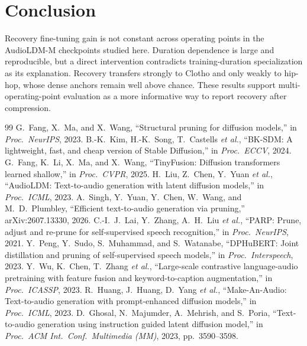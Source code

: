 \section{Conclusion}
Recovery fine-tuning gain is not constant across operating points in the AudioLDM-M checkpoints studied here. Duration dependence is large and reproducible, but a direct intervention contradicts training-duration specialization as its explanation. Recovery transfers strongly to Clotho and only weakly to hip-hop, whose dense anchors remain well above chance. These results support multi-operating-point evaluation as a more informative way to report recovery after compression.

\clearpage
{\setlength{\itemsep}{0pt}\setlength{\parsep}{0pt}
\begin{thebibliography}{99}
 G.~Fang, X.~Ma, and X.~Wang, ``Structural pruning for diffusion
models,'' in \emph{Proc.\ NeurIPS}, 2023.
 B.-K.~Kim, H.-K.~Song, T.~Castells \emph{et al.}, ``BK-SDM: A lightweight, fast,
and cheap version of Stable Diffusion,'' in \emph{Proc.\ ECCV}, 2024.
 G.~Fang, K.~Li, X.~Ma, and X.~Wang, ``TinyFusion: Diffusion transformers
learned shallow,'' in \emph{Proc.\ CVPR}, 2025.
 H.~Liu, Z.~Chen, Y.~Yuan \emph{et al.}, ``AudioLDM: Text-to-audio generation with latent diffusion models,'' in
\emph{Proc.\ ICML}, 2023.
 A.~Singh, Y.~Yuan, Y.~Chen, W.~Wang, and M.~D.~Plumbley, ``Efficient
text-to-audio generation via pruning,'' arXiv:2607.13330, 2026.
 C.-I.~J.~Lai, Y.~Zhang, A.~H.~Liu \emph{et al.}, ``PARP: Prune, adjust and
re-prune for self-supervised speech recognition,'' in \emph{Proc.\ NeurIPS}, 2021.
 Y.~Peng, Y.~Sudo, S.~Muhammad, and S.~Watanabe, ``DPHuBERT: Joint
distillation and pruning of self-supervised speech models,'' in \emph{Proc.\ Interspeech}, 2023.
 Y.~Wu, K.~Chen, T.~Zhang \emph{et al.},
``Large-scale contrastive language-audio pretraining with feature fusion and keyword-to-caption
augmentation,'' in \emph{Proc.\ ICASSP}, 2023.
 R.~Huang, J.~Huang, D.~Yang \emph{et al.}, ``Make-An-Audio:
Text-to-audio generation with prompt-enhanced diffusion models,'' in \emph{Proc.\ ICML}, 2023.
 D.~Ghosal, N.~Majumder, A.~Mehrish, and S.~Poria, ``Text-to-audio generation
using instruction guided latent diffusion model,'' in \emph{Proc.\ ACM Int.\ Conf.\ Multimedia (MM)},
2023, pp.~3590--3598.

\end{thebibliography}}
